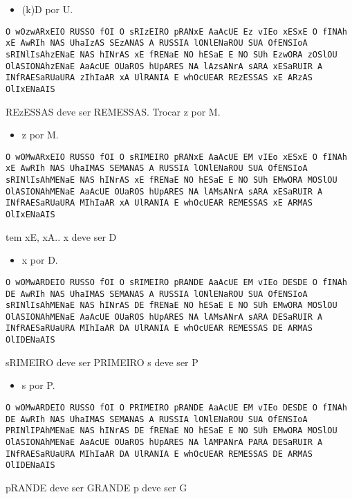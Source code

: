 \begin{frame}{}{}
\small
\begin{itemize}
\item (k)D por U.
\end{itemize}
\texttt{O wOzwARxEIO RUSSO fOI O sRIzEIRO pRANxE AaAcUE Ez vIEo xESxE O fINAh xE AwRIh NAS UhaIzAS SEzANAS A RUSSIA lONlENaROU SUA OfENSIoA sRINlIsAhzENaE NAS hINrAS xE fRENaE NO hESaE E NO SUh EzwORA zOSlOU OlASIONAhzENaE AaAcUE OUaROS hUpARES NA lAzsANrA sARA xESaRUIR A INfRAESaRUaURA zIhIaAR xA UlRANIA E whOcUEAR REzESSAS xE ARzAS OlIxENaAIS}
\begin{itemize}
\pitem REzESSAS deve ser REMESSAS.
\pitem Trocar z por M. 
\end{itemize}
\end{frame}

\begin{frame}{}{}
\small
\begin{itemize}
\item z por M.
\end{itemize}
\texttt{O wOMwARxEIO RUSSO fOI O sRIMEIRO pRANxE AaAcUE EM vIEo xESxE O fINAh xE AwRIh NAS UhaIMAS SEMANAS A RUSSIA lONlENaROU SUA OfENSIoA sRINlIsAhMENaE NAS hINrAS xE fRENaE NO hESaE E NO SUh EMwORA MOSlOU OlASIONAhMENaE AaAcUE OUaROS hUpARES NA lAMsANrA sARA xESaRUIR A INfRAESaRUaURA MIhIaAR xA UlRANIA E whOcUEAR REMESSAS xE ARMAS OlIxENaAIS}
\begin{itemize}
\pitem tem xE, xA..
\pitem x deve ser D
\end{itemize}
\end{frame}

\begin{frame}{}{}
\small
\begin{itemize}
\item x por D.
\end{itemize}
\texttt{O wOMwARDEIO RUSSO fOI O sRIMEIRO pRANDE AaAcUE EM vIEo DESDE O fINAh DE AwRIh NAS UhaIMAS SEMANAS A RUSSIA lONlENaROU SUA OfENSIoA sRINlIsAhMENaE NAS hINrAS DE fRENaE NO hESaE E NO SUh EMwORA MOSlOU OlASIONAhMENaE AaAcUE OUaROS hUpARES NA lAMsANrA sARA DESaRUIR A INfRAESaRUaURA MIhIaAR DA UlRANIA E whOcUEAR REMESSAS DE ARMAS OlIDENaAIS}
\begin{itemize}
\pitem sRIMEIRO deve ser PRIMEIRO
\pitem s deve ser P
\end{itemize}
\end{frame}

\begin{frame}{}{}
\small
\begin{itemize}
\item s por P.
\end{itemize}
\texttt{O wOMwARDEIO RUSSO fOI O PRIMEIRO pRANDE AaAcUE EM vIEo DESDE O fINAh DE AwRIh NAS UhaIMAS SEMANAS A RUSSIA lONlENaROU SUA OfENSIoA PRINlIPAhMENaE NAS hINrAS DE fRENaE NO hESaE E NO SUh EMwORA MOSlOU OlASIONAhMENaE AaAcUE OUaROS hUpARES NA lAMPANrA PARA DESaRUIR A INfRAESaRUaURA MIhIaAR DA UlRANIA E whOcUEAR REMESSAS DE ARMAS OlIDENaAIS}
\begin{itemize}
\pitem pRANDE deve ser GRANDE
\pitem p deve ser G
\end{itemize}
\end{frame}


